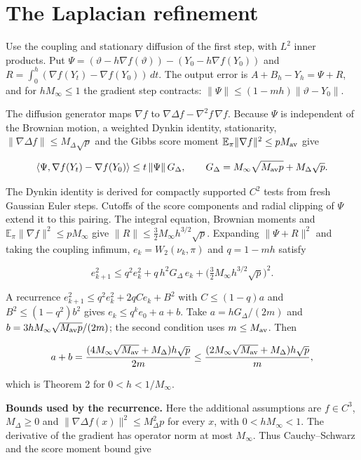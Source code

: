 \documentclass[11pt,a4paper]{report}
\begin{document}
\section{\texorpdfstring{The Laplacian refinement}{The Laplacian refinement}}


Use the coupling and
stationary diffusion of the first step, with \(L^2\) inner products. Put
\(\Psi=(\vartheta-h\nabla f(\vartheta))-(Y_0-h\nabla f(Y_0))\) and
\(R=\int_0^h(\nabla f(Y_t)-\nabla f(Y_0))\,dt\). The output error is
\(A+B_h-Y_h=\Psi+R\), and for \(hM_\infty\le1\) the gradient step contracts:
\(\|\Psi\|\le(1-mh)\|\vartheta-Y_0\|\).




The diffusion generator maps \(\nabla f\) to
\(\nabla\Delta f-\nabla^2f\,\nabla f\). Because \(\Psi\) is independent of the
Brownian motion, a weighted Dynkin identity, stationarity,
\(\|\nabla\Delta f\|\le M_\Delta\sqrt p\) and the Gibbs score moment
\(\mathbb E_\pi\|\nabla f\|^2\le pM_{\rm av}\) give


\[\langle\Psi,\nabla f(Y_t)-\nabla f(Y_0)\rangle\le t\,\|\Psi\|\,G_\Delta,
\qquad G_\Delta=M_\infty\sqrt{M_{\rm av}p}+M_\Delta\sqrt p.\]


The Dynkin identity is derived for compactly supported \(C^2\) tests from
fresh Gaussian Euler steps. Cutoffs of the score components and radial
clipping of \(\Psi\) extend it to this pairing. The integral equation,
Brownian moments and \(\mathbb E_\pi\|\nabla f\|^2\le pM_\infty\) give
\(\|R\|\le\tfrac32M_\infty h^{3/2}\sqrt p\). Expanding \(\|\Psi+R\|^2\) and
taking the coupling infimum, \(e_k=W_2(\nu_k,\pi)\) and \(q=1-mh\) satisfy


\[e_{k+1}^2\le q^2e_k^2+q\,h^2G_\Delta\,e_k+\bigl(\tfrac32M_\infty h^{3/2}\sqrt p\bigr)^2.\]


A recurrence \(e_{k+1}^2\le q^2e_k^2+2qCe_k+B^2\) with
\(C\le(1-q)a\) and \(B^2\le(1-q^2)b^2\) gives \(e_k\le q^ke_0+a+b\). Take
\(a=hG_\Delta/(2m)\) and \(b=3hM_\infty\sqrt{M_{\rm av}p}/(2m)\); the second
condition uses \(m\le M_{\rm av}\). Then


\[a+b=\frac{(4M_\infty\sqrt{M_{\rm av}}+M_\Delta)h\sqrt p}{2m}
\le\frac{(2M_\infty\sqrt{M_{\rm av}}+M_\Delta)h\sqrt p}{m},\]


which is Theorem 2 for \(0<h<1/M_\infty\).




\textbf{Bounds used by the recurrence.} Here the additional assumptions are \(f\in C^3\), \(M_\Delta\ge0\) and \(\|\nabla\Delta f(x)\|^2\le M_\Delta^2p\) for every \(x\), with \(0<hM_\infty<1\). The derivative of the gradient has operator norm at most \(M_\infty\). Thus Cauchy–Schwarz and the score moment bound give
\end{document}
